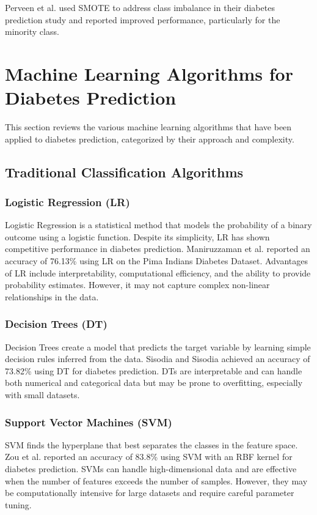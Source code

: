 \documentclass[journal]{IEEEtran}
\begin{document}
Perveen et al. \cite{perveen2016} used SMOTE to address class imbalance in their diabetes prediction study and reported improved performance, particularly for the minority class.

\section{Machine Learning Algorithms for Diabetes Prediction}
This section reviews the various machine learning algorithms that have been applied to diabetes prediction, categorized by their approach and complexity.

\subsection{Traditional Classification Algorithms}
\subsubsection{Logistic Regression (LR)}
Logistic Regression is a statistical method that models the probability of a binary outcome using a logistic function. Despite its simplicity, LR has shown competitive performance in diabetes prediction. Maniruzzaman et al. \cite{maniruzzaman2017} reported an accuracy of 76.13\% using LR on the Pima Indians Diabetes Dataset. Advantages of LR include interpretability, computational efficiency, and the ability to provide probability estimates. However, it may not capture complex non-linear relationships in the data.

\subsubsection{Decision Trees (DT)}
Decision Trees create a model that predicts the target variable by learning simple decision rules inferred from the data. Sisodia and Sisodia \cite{sisodia2018} achieved an accuracy of 73.82\% using DT for diabetes prediction. DTs are interpretable and can handle both numerical and categorical data but may be prone to overfitting, especially with small datasets.

\subsubsection{Support Vector Machines (SVM)}
SVM finds the hyperplane that best separates the classes in the feature space. Zou et al. \cite{zou2018} reported an accuracy of 83.8\% using SVM with an RBF kernel for diabetes prediction. SVMs can handle high-dimensional data and are effective when the number of features exceeds the number of samples. However, they may be computationally intensive for large datasets and require careful parameter tuning.
\end{document}
